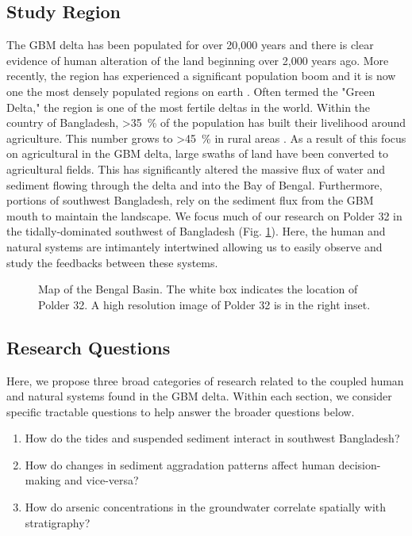 \documentclass[12pt]{article}
\begin{document}
\subsection{Study Region}

The GBM delta has been populated for over 20,000 years and there is clear evidence of human alteration of the land beginning over 2,000 years ago. More recently, the region has experienced a significant population boom and it is now one the most densely populated regions on earth \cite{bangladeshbureauofstatistics2011PopulationHousing2011}. Often termed the "Green Delta," the region is one of the most fertile deltas in the world. Within the country of Bangladesh, \SI{>35}{\percent} of the population has built their livelihood around agriculture. This number grows to \SI{>45}{\percent} in rural areas \cite{bangladeshbureauofstatisticsReportHouseholdIncome2010}. As a result of this focus on agricultural in the GBM delta, large swaths of land have been converted to agricultural fields. This has significantly altered the massive flux of water and sediment flowing through the delta and into the Bay of Bengal. Furthermore, portions of southwest Bangladesh, rely on the sediment flux from the GBM mouth to maintain the landscape. We focus much of our research on Polder 32 in the tidally-dominated southwest of Bangladesh (Fig. \ref{fig:map}). Here, the human and natural systems are intimantely intertwined allowing us to easily observe and study the feedbacks between these systems. 

\begin{figure}[H]
	\caption[Map of the Bengal Basin]{\label{fig:map} Map of the Bengal Basin. The white box indicates the location of Polder 32. A high resolution image of Polder 32 is in the right inset.}
\end{figure}

\subsection{Research Questions}

Here, we propose three broad categories of research related to the coupled human and natural systems found in the GBM delta. Within each section, we consider specific tractable questions to help answer the broader questions below.

\begin{enumerate}
	\item How do the tides and suspended sediment interact in southwest Bangladesh?
	\item How do changes in sediment aggradation patterns affect human decision-making and vice-versa?
	\item How do arsenic concentrations in the groundwater correlate spatially with stratigraphy?
\end{enumerate}
\end{document}
